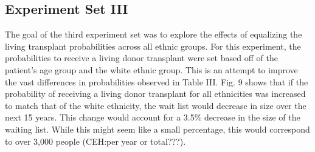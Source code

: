 \documentclass[9pt,a4paper,twocolumn]{scrartcl}
\begin{document}
\subsection{Experiment Set III}
The goal of the third experiment set was to explore the effects of equalizing the living transplant probabilities across all ethnic groups.  For this experiment, the probabilities to receive a living donor transplant were set based off of the patient’s age group and the white ethnic group.  This is an attempt to improve the vast differences in probabilities observed in Table III.  
Fig. 9 shows that if the probability of receiving a living donor transplant for all ethnicities was increased to match that of the white ethnicity, the wait list would decrease in size over the next 15 years.  This change would account for a 3.5\% decrease in the size of the waiting list.  While this might seem like a small percentage, this would correspond to over 3,000 people (CEH:per year or total???).
\end{document}
